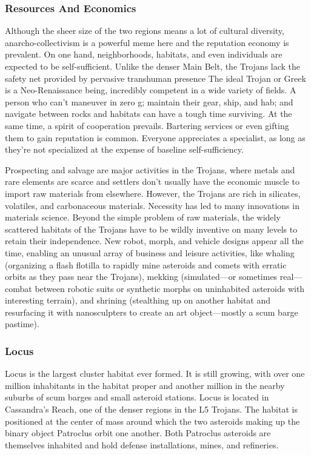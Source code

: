\subsubsection{Resources And Economics}

Although the sheer size of the two regions means 
a lot of cultural diversity, anarcho-collectivism is a 
powerful meme here and the reputation economy is 
prevalent. On one hand, neighborhoods, habitats, 
and even individuals are expected to be self-sufficient. 
Unlike the denser Main Belt, the Trojans lack the 
safety net provided by pervasive transhuman presence
The ideal Trojan or Greek is a Neo-Renaissance
being, incredibly competent in a wide variety of fields. 
A person who can't maneuver in zero g; maintain 
their gear, ship, and hab; and navigate between rocks 
and habitats can have a tough time surviving. At the 
same time, a spirit of cooperation prevails. Bartering 
services or even gifting them to gain reputation is 
common. Everyone appreciates a specialist, as long 
as they're not specialized at the expense of baseline 
self-sufficiency.

Prospecting and salvage are major activities in 
the Trojans, where metals and rare elements are 
scarce and settlers don't usually have the economic 
muscle to import raw materials from elsewhere. 
However, the Trojans are rich in silicates, volatiles, 
and carbonaceous materials. Necessity has led to 
many innovations in materials science. Beyond the 
simple problem of raw materials, the widely scattered
habitats of the Trojans have to be wildly inventive
on many levels to retain their independence.
New robot, morph, and vehicle designs appear all 
the time, enabling an unusual array of business and 
leisure activities, like whaling (organizing a flash 
flotilla to rapidly mine asteroids and comets with erratic
orbits as they pass near the Trojans), mekking
(simulated—or sometimes real—combat between 
robotic suits or synthetic morphs on uninhabited
asteroids with interesting terrain), and shrining
(stealthing up on another habitat and resurfacing it 
with nanosculpters to create an art object—mostly a 
scum barge pastime).

\subsubsection{Locus}

Locus is the largest cluster habitat ever formed. It 
is still growing, with over one million inhabitants 
in the habitat proper and another million in the 
nearby suburbs of scum barges and small asteroid 
stations. Locus is located in Cassandra's Reach, one 
of the denser regions in the L5 Trojans. The habitat 
is positioned at the center of mass around which the 
two asteroids making up the binary object Patroclus
orbit one another. Both Patroclus asteroids are
themselves inhabited and hold defense installations, 
mines, and refineries.

